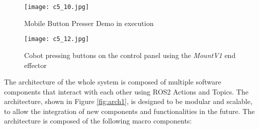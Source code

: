 \begin{figure}[t]
    \centering
    \texttt{[image: c5\_10.jpg]}
    \caption{Mobile Button Presser Demo in execution}
    \label{fig:buttonpresser1}
\end{figure}

\begin{figure}[t]
    \centering
    \texttt{[image: c5\_12.jpg]}
    \caption{Cobot pressing buttons on the control panel using the \textit{MountV1} end effector}
    \label{fig:buttonpresser2}
\end{figure}

The architecture of the whole system is composed of multiple software components that interact with each other
using ROS2 Actions and Topics. The architecture, shown in Figure \ref{fig:arch1}, is designed to be modular
and scalable, to allow the integration of new components and functionalities in the future.
The architecture is composed of the following macro components:

